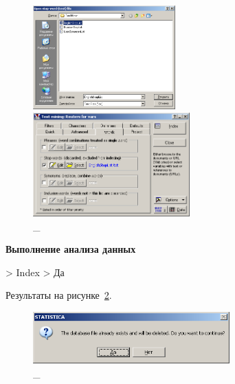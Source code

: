 \begin{figure}[!h]
  \centering

  \begin{minipage}{0.49\textwidth}
    \centering

    \includegraphics[height=4cm]
    {inc/var5/7.PNG}

    \caption{\_}

    \label{fig:var5_7}
  \end{minipage}
  \begin{minipage}{0.49\textwidth}
    \centering

    \includegraphics[height=4cm]
    {inc/var5/8.PNG}

    \caption{\_}

    \label{fig:var5_8}
  \end{minipage}
\end{figure}

\newpage

\begin{center}
  \textbf{Выполнение анализа данных}
\end{center}

> Index > Да

Результаты на рисунке~\ref{fig:var5_9}.

\begin{figure}[!h]
  \centering

  \includegraphics[height=2cm]
  {inc/var5/9.PNG}

  \caption{\_}

  \label{fig:var5_9}
\end{figure}

